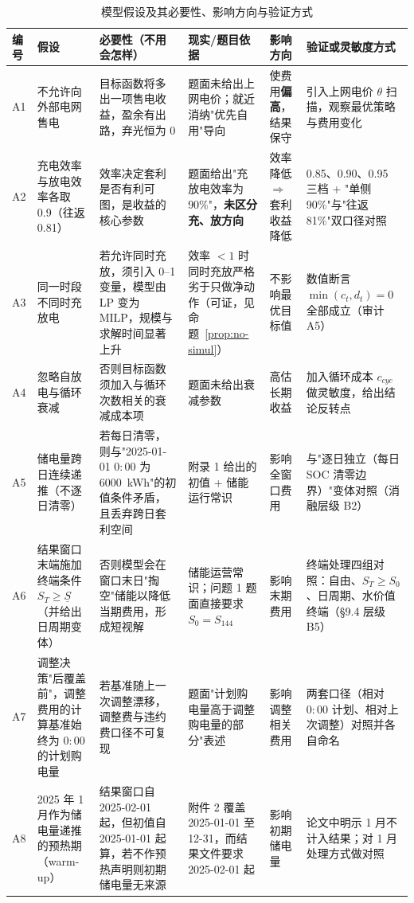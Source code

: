 \begin{table}[htbp]
  \centering
  \caption{模型假设及其必要性、影响方向与验证方式}
  \label{tab:assumptions}
  \footnotesize
  \setlength{\tabcolsep}{4pt}
  \begin{tabularx}{\linewidth}{C{0.7cm} L{2.9cm} L{3.4cm} L{2.9cm} L{1.7cm} Y}
    \toprule
    编号 & 假设 & 必要性（不用会怎样） & 现实/题目依据 & 影响方向 & 验证或灵敏度方式 \\
    \midrule
    A1 & 不允许向外部电网售电
       & 目标函数将多出一项售电收益，盈余有出路，弃光恒为 0
       & 题面未给出上网电价；就近消纳"优先自用"导向
       & 使费用\textbf{偏高}，结果保守
       & 引入上网电价 \(\theta\) 扫描，观察最优策略与费用变化 \\
    \addlinespace
    A2 & 充电效率与放电效率各取 0.9（往返 0.81）
       & 效率决定套利是否有利可图，是收益的核心参数
       & 题面给出"充放电效率为 90\%"，\textbf{未区分充、放方向}
       & 效率降低 \(\Rightarrow\) 套利收益降低
       & 0.85、0.90、0.95 三档 + "单侧 90\%"与"往返 81\%"双口径对照 \\
    \addlinespace
    A3 & 同一时段不同时充放电
       & 若允许同时充放，须引入 0--1 变量，模型由 LP 变为 MILP，规模与求解时间显著上升
       & 效率 \(<1\) 时同时充放严格劣于只做净动作（可证，见命题~\ref{prop:no-simul}）
       & 不影响最优目标值
       & 数值断言 \(\min(c_t,d_t)=0\) 全部成立（审计 A5） \\
    \addlinespace
    A4 & 忽略自放电与循环衰减
       & 否则目标函数须加入与循环次数相关的衰减成本项
       & 题面未给出衰减参数
       & 高估长期收益
       & 加入循环成本 \(c_{cyc}\) 做灵敏度，给出结论反转点 \\
    \addlinespace
    A5 & 储电量跨日连续递推（不逐日清零）
       & 若每日清零，则与"2025-01-01 \(0{:}00\) 为 6000~kWh"的初值条件矛盾，且丢弃跨日套利空间
       & 附录 1 给出的初值 + 储能运行常识
       & 影响全窗口费用
       & 与"逐日独立（每日 SOC 清零边界）"变体对照（消融层级 B2） \\
    \addlinespace
    A6 & 结果窗口末端施加终端条件 \(S_T\ge \underline S\)（并给出日周期变体）
       & 否则模型会在窗口末日"掏空"储能以降低当期费用，形成短视解
       & 储能运营常识；问题 1 题面直接要求 \(S_0=S_{144}\)
       & 影响末期费用
       & 终端处理四组对照：自由、\(S_T\ge S_0\)、日周期、水价值终端（§9.4 层级 B5） \\
    \addlinespace
    A7 & 调整决策"后覆盖前"，调整费用的计算基准始终为 \(0{:}00\) 的计划购电量
       & 若基准随上一次调整漂移，调整费与违约费口径不可复现
       & 题面"计划购电量高于调整购电量的部分"表述
       & 影响调整相关费用
       & 两套口径（相对 \(0{:}00\) 计划、相对上次调整）对照并各自命名 \\
    \addlinespace
    A8 & 2025 年 1 月作为储电量递推的预热期（warm-up）
       & 结果窗口自 2025-02-01 起，但初值自 2025-01-01 起算，若不作预热声明则初期储电量无来源
       & 附件 2 覆盖 2025-01-01 至 12-31，而结果文件要求 2025-02-01 起
       & 影响初期储电量
       & 论文中明示 1 月不计入结果；对 1 月处理方式做对照 \\
    \bottomrule
  \end{tabularx}
\end{table}

